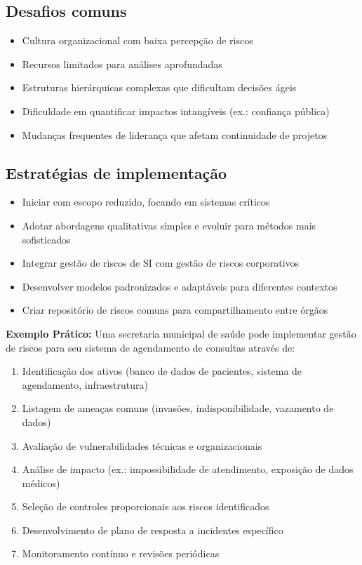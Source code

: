 \documentclass[12pt,a4paper]{report}
\begin{document}
\subsection{Desafios comuns}

\begin{itemize}
  \item Cultura organizacional com baixa percepção de riscos
  \item Recursos limitados para análises aprofundadas
  \item Estruturas hierárquicas complexas que dificultam decisões ágeis
  \item Dificuldade em quantificar impactos intangíveis (ex.: confiança pública)
  \item Mudanças frequentes de liderança que afetam continuidade de projetos
\end{itemize}

\subsection{Estratégias de implementação}

\begin{itemize}
  \item Iniciar com escopo reduzido, focando em sistemas críticos
  \item Adotar abordagens qualitativas simples e evoluir para métodos mais sofisticados
  \item Integrar gestão de riscos de SI com gestão de riscos corporativos
  \item Desenvolver modelos padronizados e adaptáveis para diferentes contextos
  \item Criar repositório de riscos comuns para compartilhamento entre órgãos
\end{itemize}

\begin{infobox}
\textbf{Exemplo Prático:} Uma secretaria municipal de saúde pode implementar gestão de riscos para seu sistema de agendamento de consultas através de:

\begin{enumerate}
  \item Identificação dos ativos (banco de dados de pacientes, sistema de agendamento, infraestrutura)
  \item Listagem de ameaças comuns (invasões, indisponibilidade, vazamento de dados)
  \item Avaliação de vulnerabilidades técnicas e organizacionais
  \item Análise de impacto (ex.: impossibilidade de atendimento, exposição de dados médicos)
  \item Seleção de controles proporcionais aos riscos identificados
  \item Desenvolvimento de plano de resposta a incidentes específico
  \item Monitoramento contínuo e revisões periódicas
\end{enumerate}
\end{infobox}
\end{document}
